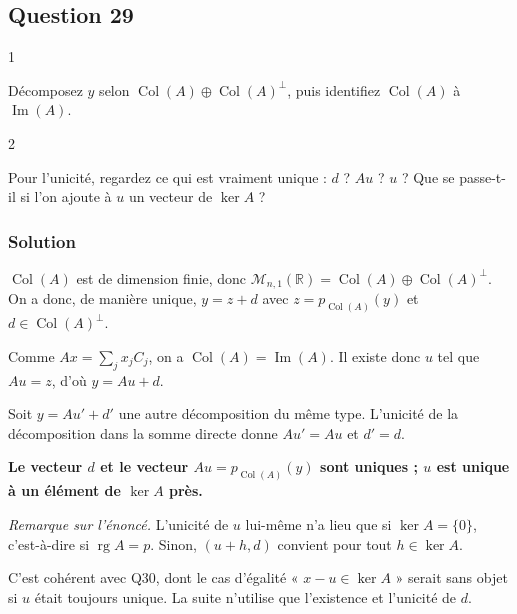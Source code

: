 \documentclass[11pt,a4paper]{article}
\begin{document}
\hypertarget{question-29}{%
\subsection{Question 29}\label{question-29}}

\begin{indication}{1}

Décomposez \(y\) selon \(\operatorname{Col}(A)\oplus\operatorname{Col}(A)^\perp\), puis identifiez \(\operatorname{Col}(A)\) à \(\operatorname{Im}(A)\).

\end{indication}

\begin{indication}{2}

Pour l'unicité, regardez ce qui est vraiment unique : \(d\) ? \(Au\) ? \(u\) ? Que se passe-t-il si l'on ajoute à \(u\) un vecteur de \(\ker A\) ?

\end{indication}

\hypertarget{solution-28}{%
\subsubsection{Solution}\label{solution-28}}

\(\operatorname{Col}(A)\) est de dimension finie, donc \(\mathcal M_{n,1}(\mathbb R)=\operatorname{Col}(A)\oplus\operatorname{Col}(A)^\perp\). On a donc, de manière unique, \(y=z+d\) avec \(z=p_{\operatorname{Col}(A)}(y)\) et \(d\in\operatorname{Col}(A)^\perp\).

Comme \(Ax=\sum_jx_jC_j\), on a \(\operatorname{Col}(A)=\operatorname{Im}(A)\). Il existe donc \(u\) tel que \(Au=z\), d'où \(y=Au+d\).

Soit \(y=Au'+d'\) une autre décomposition du même type. L'unicité de la décomposition dans la somme directe donne \(Au'=Au\) et \(d'=d\).

\textbf{Le vecteur \(d\) et le vecteur \(Au=p_{\operatorname{Col}(A)}(y)\) sont uniques ; \(u\) est unique à un élément de \(\ker A\) près.}

\emph{Remarque sur l'énoncé.} L'unicité de \(u\) lui-même n'a lieu que si \(\ker A=\{0\}\), c'est-à-dire si \(\operatorname{rg}A=p\). Sinon, \((u+h,d)\) convient pour tout \(h\in\ker A\).

C'est cohérent avec Q30, dont le cas d'égalité « \(x-u\in\ker A\) » serait sans objet si \(u\) était toujours unique. La suite n'utilise que l'existence et l'unicité de \(d\).
\end{document}
